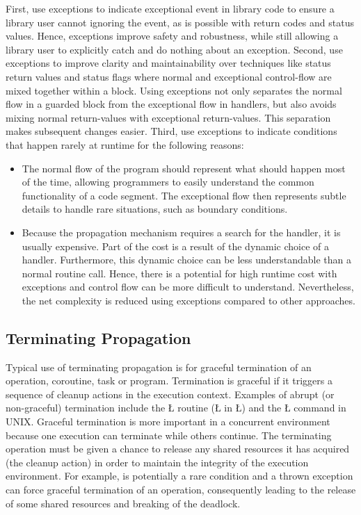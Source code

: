 \documentclass[openright,twoside]{report}
\begin{document}
First, use exceptions to indicate exceptional event in library code to ensure a library user cannot ignoring the event, as is possible with return codes and status values.
Hence, exceptions improve safety and robustness, while still allowing a library user to explicitly catch and do nothing about an exception.
Second, use exceptions to improve clarity and maintainability over techniques like status return values and status flags where normal and exceptional control-flow are mixed together within a block.
Using exceptions not only separates the normal flow in a guarded block from the exceptional flow in handlers, but also avoids mixing normal return-values with exceptional return-values.
This separation makes subsequent changes easier.
Third, use exceptions to indicate conditions that happen rarely at runtime for the following reasons:
\begin{itemize}
\item
The normal flow of the program should represent what should happen most of the time, allowing programmers to easily understand the common functionality of a code segment.
The exceptional flow then represents subtle details to handle rare situations, such as boundary conditions.
\item
Because the propagation mechanism requires a search for the handler, it is usually expensive.
Part of the cost is a result of the dynamic choice of a handler.
Furthermore, this dynamic choice can be less understandable than a normal routine call.
Hence, there is a potential for high runtime cost with exceptions and control flow can be more difficult to understand.
Nevertheless, the net complexity is reduced using exceptions compared to other approaches.
\end{itemize}


\subsection{Terminating Propagation}

Typical use of terminating propagation is for graceful termination of an operation, coroutine, task or program.
Termination is graceful if it triggers a sequence of cleanup actions in the execution context.
Examples of abrupt (or non-graceful) termination include the \LGinlinetrue\LGbegin\lgrinde\L{}\endlgrinde\LGend{} routine (\LGinlinetrue\LGbegin\lgrinde\L{}\endlgrinde\LGend{} in \LGinlinetrue\LGbegin\lgrinde\L{}\endlgrinde\LGend{}) and the \LGinlinetrue\LGbegin\lgrinde\L{}\endlgrinde\LGend{} command in UNIX.
Graceful termination is more important in a concurrent environment because one execution can terminate while others continue.
The terminating operation must be given a chance to release any shared resources it has acquired (the cleanup action) in order to maintain the integrity of the execution environment.
For example,  is potentially a rare condition and a thrown exception can force graceful termination of an operation, consequently leading to the release of some shared resources and breaking of the deadlock.
\end{document}
